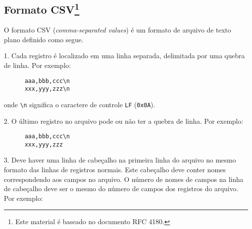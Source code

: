 \documentclass[11pt, brazil]{report}
\begin{document}
%
%
%
%
%

\newpage

\subsection*{Formato CSV\footnote{Este material é baseado no documento RFC
4180.}}

O formato CSV (\textit{comma-separated values}) é um formato de arquivo de texto plano
definido como segue.

1. Cada registro é localizado em uma linha separada, delimitada por uma quebra de linha. Por exemplo:

\begin{verbatim}
      aaa,bbb,ccc\n
      xxx,yyy,zzz\n
\end{verbatim}

\noindent
onde \verb|\n| significa o caractere de controle \verb|LF| ({\tt 0x0A}).

2. O último registro no arquivo pode ou não ter a quebra de linha. Por exemplo:

\begin{verbatim}
      aaa,bbb,ccc\n
      xxx,yyy,zzz
\end{verbatim}

3. Deve haver uma linha de cabeçalho na primeira linha do arquivo no
mesmo formato das linhas de registros normais. Este cabeçalho deve
conter nomes correspondendo aos campos no arquivo. O número de nomes
de campos na linha de cabeçalho deve ser o mesmo do número de campos
dos registros do arquivo. Por exemplo:
\end{document}
